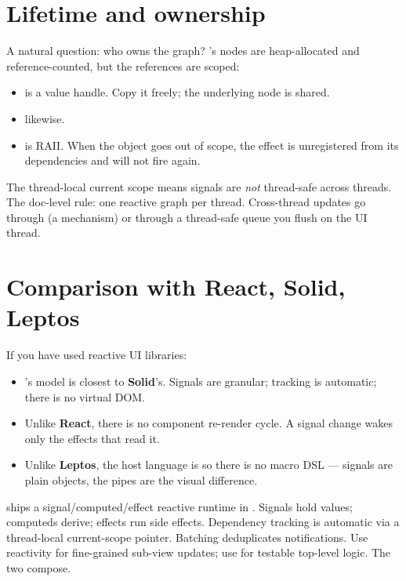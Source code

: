 \section{Lifetime and ownership}

A natural question: who owns the  graph? \maya{}'s
nodes are heap-allocated and reference-counted, but the references
are scoped:

\begin{itemize}[leftmargin=*]
  \item {} is a value handle. Copy it freely; the
    underlying node is shared.
  \item {} likewise.
  \item {} is RAII. When the  object goes out
    of scope, the effect is unregistered from its dependencies and
    will not fire again.
\end{itemize}

The thread-local current scope means signals are \emph{not}
thread-safe across threads. The doc-level rule: one reactive graph
per thread. Cross-thread updates go through  (a
 mechanism) or through a thread-safe queue you flush
on the UI thread.

\section{Comparison with React, Solid, Leptos}

If you have used reactive UI libraries:

\begin{itemize}[leftmargin=*]
  \item \maya{}'s model is closest to \textbf{Solid}'s. Signals are
    granular; tracking is automatic; there is no virtual DOM.
  \item Unlike \textbf{React}, there is no component re-render cycle.
    A signal change wakes only the effects that read it.
  \item Unlike \textbf{Leptos}, the host language is \cpp{} so
    there is no macro DSL --- signals are plain objects, the
    \code{|} pipes are the visual difference.
\end{itemize}

\begin{recap}
\maya{} ships a signal/computed/effect reactive runtime in
. Signals hold values; computeds derive;
effects run side effects. Dependency tracking is automatic via a
thread-local current-scope pointer. Batching deduplicates
notifications. Use reactivity for fine-grained sub-view updates;
use  for testable top-level logic. The two compose.
\end{recap}

